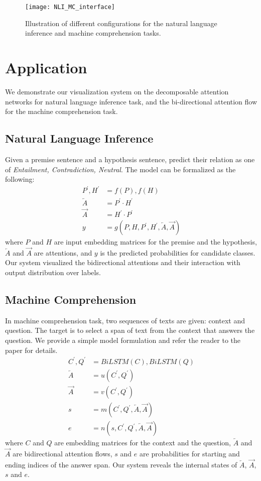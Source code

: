 \begin{figure*}[t]
\centering
\vspace{-2mm}
 \texttt{[image: NLI\_MC\_interface]}
  \vspace{-6mm}
 \caption{
Illustration of different configurations for the natural language inference and machine comprehension tasks.
}
\label{fig:pipelineUpdate}
\end{figure*}

\section{Application}
We demonstrate our visualization system on the decomposable attention networks
for natural language inference task, and the bi-directional attention flow for the machine comprehension task.

\subsection{Natural Language Inference}
Given a premise sentence and a hypothesis sentence,
predict their relation as one of \emph{Entailment, Contradiction, Neutral}.
The model can be formalized as the following:
\begin{align}
	P^\prime, H^\prime &= f(P), f(H)\\
	\overleftarrow{A} &= P^\prime \cdot H^\prime\\
	\overrightarrow{A} &= H^\prime \cdot P^\prime\\
	y &= g(P, H, P^\prime, H^\prime, \overleftarrow{A}, \overrightarrow{A})
\end{align}
where $P$ and $H$ are input embedding matrices for the premise and the hypothesis, $\overleftarrow{A}$
and $\overrightarrow{A}$ are attentions, and $y$ is the predicted probabilities for candidate classes.
Our system visualized the bidirectional attentions and their interaction with output distribution over labels.


\subsection{Machine Comprehension}
In machine comprehension task, two sequences of texts are given: context and question.
The target is to select a span of text from the context that answers the question. We provide a simple model
formulation and refer the reader to the paper for details.
\begin{align}
	C^\prime, Q^\prime &= BiLSTM(C), BiLSTM(Q)\\
	\overleftarrow{A} &= u(C^\prime, Q^\prime)\\
	\overrightarrow{A} &= v(C^\prime, Q^\prime)\\
	s &= m(C^\prime, Q^\prime, \overleftarrow{A}, \overrightarrow{A})\\
	e &= n(s, C^\prime, Q^\prime, \overleftarrow{A}, \overrightarrow{A})
\end{align}
where $C$ and $Q$ are embedding matrices for the context and the question,
$\overleftarrow{A}$ and $\overrightarrow{A}$ are bidirectional attention flows,
$s$ and $e$ are probabilities for starting and ending indices of the answer span.
Our system reveals the internal states of $\overleftarrow{A}$, $\overrightarrow{A}$,
$s$ and $e$.
